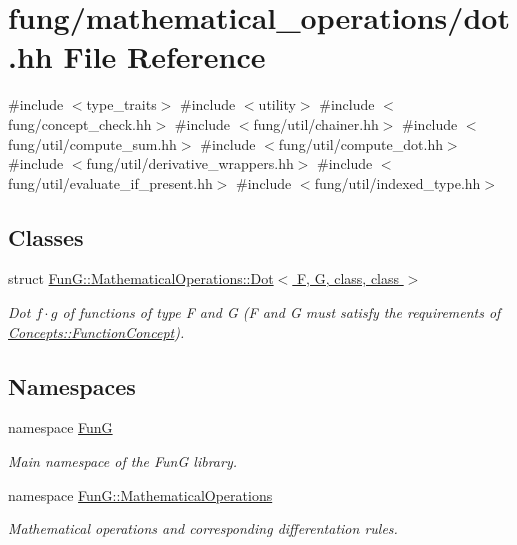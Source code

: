 \hypertarget{dot_8hh}{\section{fung/mathematical\-\_\-operations/dot.hh \-File \-Reference}
\label{dot_8hh}
}
{\ttfamily \#include $<$type\-\_\-traits$>$}\*
{\ttfamily \#include $<$utility$>$}\*
{\ttfamily \#include $<$fung/concept\-\_\-check.\-hh$>$}\*
{\ttfamily \#include $<$fung/util/chainer.\-hh$>$}\*
{\ttfamily \#include $<$fung/util/compute\-\_\-sum.\-hh$>$}\*
{\ttfamily \#include $<$fung/util/compute\-\_\-dot.\-hh$>$}\*
{\ttfamily \#include $<$fung/util/derivative\-\_\-wrappers.\-hh$>$}\*
{\ttfamily \#include $<$fung/util/evaluate\-\_\-if\-\_\-present.\-hh$>$}\*
{\ttfamily \#include $<$fung/util/indexed\-\_\-type.\-hh$>$}\*
\subsection*{\-Classes}
\begin{DoxyCompactItemize}
\item 
struct \hyperlink{structFunG_1_1MathematicalOperations_1_1Dot}{\-Fun\-G\-::\-Mathematical\-Operations\-::\-Dot$<$ F, G, class, class $>$}
\begin{DoxyCompactList}\small\item\em \-Dot $f \cdot g$ of functions of type \-F and \-G (\-F and \-G must satisfy the requirements of \hyperlink{structFunG_1_1Concepts_1_1FunctionConcept}{\-Concepts\-::\-Function\-Concept}). \end{DoxyCompactList}\end{DoxyCompactItemize}
\subsection*{\-Namespaces}
\begin{DoxyCompactItemize}
\item 
namespace \hyperlink{namespaceFunG}{\-Fun\-G}
\begin{DoxyCompactList}\small\item\em \-Main namespace of the \-Fun\-G library. \end{DoxyCompactList}\item 
namespace \hyperlink{namespaceFunG_1_1MathematicalOperations}{\-Fun\-G\-::\-Mathematical\-Operations}
\begin{DoxyCompactList}\small\item\em \-Mathematical operations and corresponding differentation rules. \end{DoxyCompactList}\end{DoxyCompactItemize}

